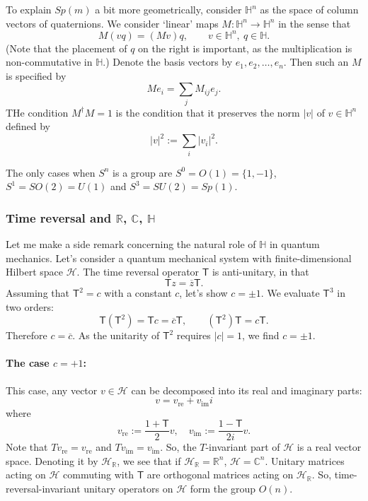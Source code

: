\documentclass[12pt]{article}
\numberwithin{equation}{section}
\def\bC{\mathbb{C}}
\def\bH{\mathbb{H}}
\def\bR{\mathbb{R}}
\def\cH{\mathcal{H}}
\def\sT{\mathsf{T}}
\begin{document}
To explain $Sp(m)$ a bit more geometrically, consider $\bH^n$
as the space of column vectors of quaternions. 
We consider `linear' maps  $M:\bH^n\to \bH^n$ in the sense that
\begin{equation}
M (vq) = (Mv) q, \qquad v\in \bH^n,\ q\in \bH.
\end{equation} 
(Note that the placement of $q$ on the right is important, 
as the multiplication is non-commutative in $\bH$.)
Denote the basis vectors by $e_1,e_2,\ldots,e_n$.
Then such an $M$ is specified by \begin{equation}
M e_i = \sum_j M_{ij} e_j.
\end{equation}
THe condition $M^\dagger M=1$ is the condition that it preserves the norm $|v|$ of $v\in \bH^n$
defined by \begin{equation}
  |v|^2 := \sum_i |v_i|^2.
\end{equation}

\begin{fact}
  The only cases when $S^n$ is a group are $S^0=O(1)=\{1,-1\}$, $S^1=SO(2)=U(1)$
  and $S^3=SU(2)=Sp(1)$.
\end{fact}
  
\subsubsection{Time reversal and $\bR$, $\bC$, $\bH$}

Let me make a side remark concerning the natural role of $\bH$ in quantum mechanics.
Let's consider a quantum mechanical system with finite-dimensional Hilbert space $\cH$.
The time reversal operator $\sT$ is anti-unitary, in that 
\begin{equation}
  \sT z = \overline z \sT.
\end{equation}
Assuming that $\sT^2=c$ with a constant $c$, let's show $c=\pm1$. We evaluate $\sT^3$ in two orders:
\begin{equation}
\sT(\sT^2)= \sT c = \overline{c}\sT,\qquad
(\sT^2)\sT = c\sT.
\end{equation} Therefore $c=\overline{c}$. As the unitarity of $\sT^2$ requires $|c|=1$,
 we find $c=\pm 1$.

 \paragraph{The case $c=+1$:}
 This case, any vector $v\in \cH$ can be decomposed into its real and imaginary parts:
  \begin{equation}
    v = v_\text{re} + v_\text{im} i 
  \end{equation}
  where
  \begin{equation}
    v_\text{re}:= \frac{1+\sT}{2} v, \quad v_\text{im}:=\frac{1-\sT}{2i}v .
  \end{equation}
  Note that $T v_\text{re}= v_\text{re}$ and $T v_\text{im}=v_\text{im}$.
So, the $T$-invariant part of $\cH$ is a real vector space.
Denoting it by $\cH_\bR$, we see that if $\cH_\bR=\bR^n$, $\cH=\bC^n$.
Unitary matrices acting on $\cH$ commuting with $\sT$
are orthogonal matrices acting on $\cH_\bR$.
So, time-reversal-invariant unitary operators on $\cH$ 
form the group $O(n)$.
\end{document}
